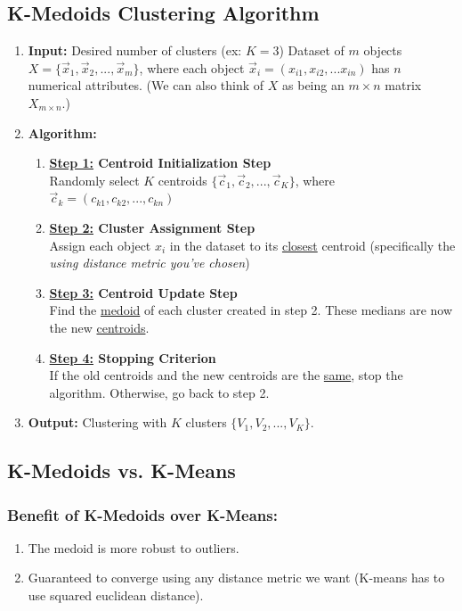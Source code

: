\documentclass[11pt]{elegantbook}
\begin{document}
\subsection{K-Medoids Clustering Algorithm}
\begin{enumerate}
    \item \textbf{Input:}
    \subitem Desired number of clusters (ex: $K=3$)
    \subitem Dataset of $m$ objects $X=\{\vec{x}_1,\vec{x}_2,...,\vec{x}_m\}$, where each object $\vec{x}_i=(x_{i1},x_{i2},...x_{in})$ has $n$ numerical attributes. (We can also think of $X$ as being an $m\times n$ matrix $X_{m\times n}$.)
    \item \textbf{Algorithm:}
    \begin{enumerate}[$\bullet$]
        \item \textbf{\underline{Step 1:} Centroid Initialization Step}\\
        Randomly select $K$ centroids $\{\vec{c}_1,\vec{c}_2,...,\vec{c}_K\}$, where $\vec{c}_k=(c_{k1},c_{k2},...,c_{kn})$
        \item \textbf{\underline{Step 2:} Cluster Assignment Step}\\
        Assign each object $x_i$ in the dataset to its \underline{closest} centroid (specifically the \textit{using distance metric you've chosen})
        \item \textbf{\underline{Step 3:} Centroid Update Step}\\
        Find the \underline{medoid} of each cluster created in step 2. These medians are now the new \underline{centroids}.
        \item \textbf{\underline{Step 4:} Stopping Criterion}\\
        If the old centroids and the new centroids are the \underline{same}, stop the algorithm. Otherwise, go back to step 2.
    \end{enumerate}
    \item \textbf{Output:} Clustering with $K$ clusters $\{V_1,V_2,...,V_K\}$.
\end{enumerate}

\subsection{K-Medoids vs. K-Means}
\subsubsection*{Benefit of K-Medoids over K-Means:}
\begin{enumerate}
    \item The medoid is more robust to outliers.
    \item Guaranteed to converge using any distance metric we want (K-means has to use squared euclidean distance).
\end{enumerate}
\end{document}
